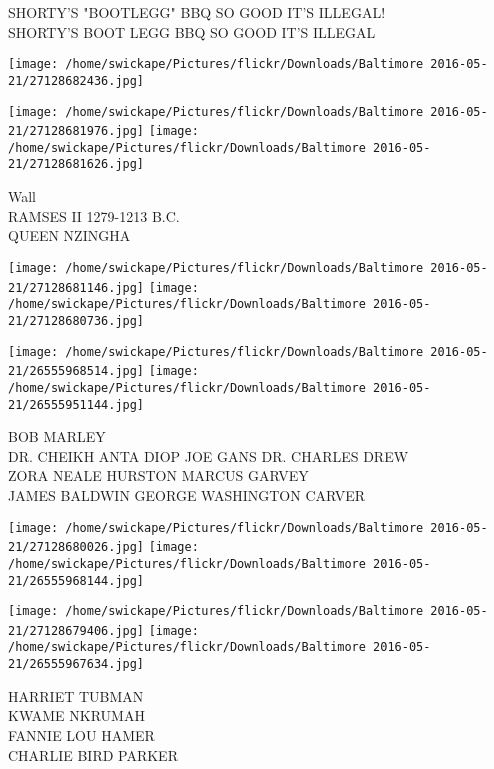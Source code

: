 \documentclass[10pt,letterpaper]{article}
\begin{document}
SHORTY'S "BOOTLEGG" BBQ SO GOOD IT'S ILLEGAL!\\
SHORTY'S BOOT LEGG BBQ SO GOOD IT'S ILLEGAL\\
\pagebreak

\texttt{[image: /home/swickape/Pictures/flickr/Downloads/Baltimore 2016-05-21/27128682436.jpg]}

\vspace{0.25in}
\texttt{[image: /home/swickape/Pictures/flickr/Downloads/Baltimore 2016-05-21/27128681976.jpg]}
\texttt{[image: /home/swickape/Pictures/flickr/Downloads/Baltimore 2016-05-21/27128681626.jpg]}

Wall\\
RAMSES II 1279{-}1213 B.C.\\
QUEEN NZINGHA\\
\pagebreak

\texttt{[image: /home/swickape/Pictures/flickr/Downloads/Baltimore 2016-05-21/27128681146.jpg]}
\texttt{[image: /home/swickape/Pictures/flickr/Downloads/Baltimore 2016-05-21/27128680736.jpg]}

\texttt{[image: /home/swickape/Pictures/flickr/Downloads/Baltimore 2016-05-21/26555968514.jpg]}
\texttt{[image: /home/swickape/Pictures/flickr/Downloads/Baltimore 2016-05-21/26555951144.jpg]}

BOB MARLEY\\
DR. CHEIKH ANTA DIOP JOE GANS DR. CHARLES DREW\\
ZORA NEALE HURSTON MARCUS GARVEY\\
JAMES BALDWIN GEORGE WASHINGTON CARVER\\
\pagebreak

\texttt{[image: /home/swickape/Pictures/flickr/Downloads/Baltimore 2016-05-21/27128680026.jpg]}
\texttt{[image: /home/swickape/Pictures/flickr/Downloads/Baltimore 2016-05-21/26555968144.jpg]}

\texttt{[image: /home/swickape/Pictures/flickr/Downloads/Baltimore 2016-05-21/27128679406.jpg]}
\texttt{[image: /home/swickape/Pictures/flickr/Downloads/Baltimore 2016-05-21/26555967634.jpg]}

HARRIET TUBMAN\\
KWAME NKRUMAH\\
FANNIE LOU HAMER\\
CHARLIE BIRD PARKER\\
\pagebreak
\end{document}
